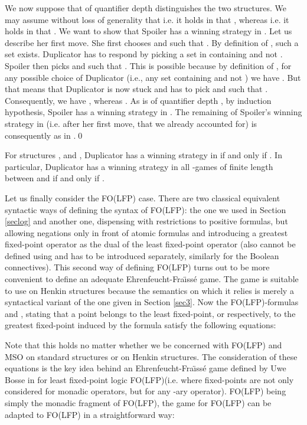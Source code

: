 \documentclass{LMCS}
\newcommand{\mso}{\textsf{MSO}\xspace}
\newcommand{\folfp}{\textsf{FO(LFP)}\xspace}
\newcommand{\lfp}{\textsf{FO(LFP)}\xspace}
\begin{document}
\begin{iteMize}{}
We now suppose that  of
quantifier depth  distinguishes the two structures. We may assume without loss of generality that
 i.e. it holds
in  that , whereas  i.e. it holds in  that
. We want to
show that Spoiler has a winning strategy  in
. Let us
describe her first move. She first chooses  and
 such that . By definition of , such a set exists. Duplicator has
to respond by picking a set  in  containing  and not . Spoiler then
picks  and  such that . This is possible because
by definition of , for any possible choice  of Duplicator (i.e., any set  containing  and not )
we have . But that means that Duplicator is now stuck and
has to pick  and  such that . Consequently, we have
,
whereas . As
 is of quantifier depth , by induction
hypothesis, Spoiler has a winning strategy in . The
remaining of Spoiler's winning strategy in  (i.e. after her first move, that we
already accounted for) is consequently as in .\qed
\end{iteMize}

\begin{cor}
For structures ,  and , Duplicator has a winning strategy in  if and only if . In particular, Duplicator has a winning strategy in all -games of finite length between  and  if and only if .
\end{cor}

Let us finally consider the \folfp case. There are two classical
equivalent syntactic ways of defining the syntax of \folfp: the one
we used in Section \ref{seclog} and another one, dispensing with
restrictions to positive formulas, but allowing negations only in
front of atomic formulas and introducing a greatest fixed-point
operator as the dual of the least fixed-point operator (also
 cannot be defined using  and has to be
introduced separately, similarly for the Boolean connectives).
This second way of defining \folfp turns out to be more convenient
to define an adequate Ehrenfeucht-Fra\"{\i}ss\'e game. The game is
suitable to use on Henkin structures because the semantics on
which it relies is merely a syntactical variant of the one given
in Section \ref{sec3}. Now the \folfp-formulas  and , stating that a
point belongs to the least fixed-point, or respectively, to the
greatest fixed-point induced by the formula  satisfy the
following equations:
\begin{center}



\end{center}
Note that this holds no matter whether we be concerned with \folfp and \mso on
standard structures or on Henkin structures. The consideration of
these equations is the key idea behind an
Ehrenfeucht-Fra\"{\i}ss\'e game defined by Uwe Bosse in
\cite{736408} for least fixed-point logic \lfp (i.e. where
fixed-points are not only considered for monadic operators, but
for any -ary operator). \folfp being simply the monadic
fragment of \lfp, the game for \lfp can be adapted to \folfp in a
straightforward way:
\end{document}
